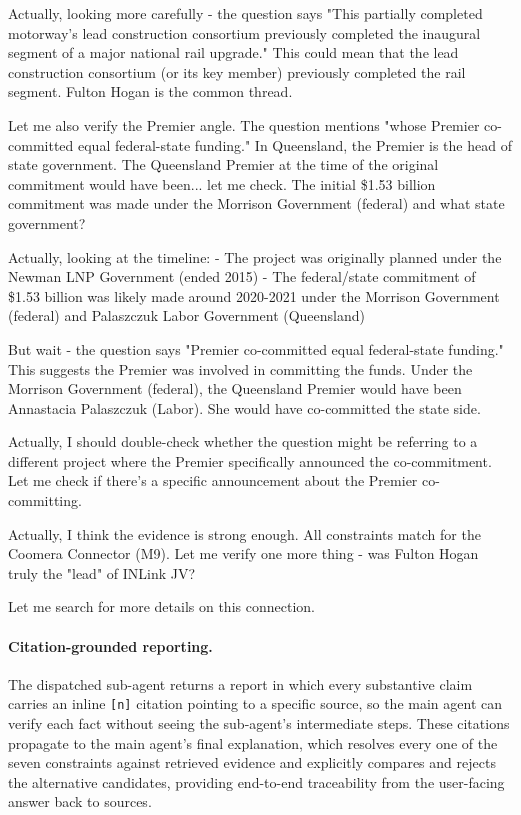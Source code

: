 \documentclass{llmxive}
\begin{document}
\begin{tcolorbox}
Actually, looking more carefully - the question says "This partially completed motorway's lead construction consortium previously completed the inaugural segment of a major national rail upgrade." This could mean that the lead construction consortium (or its key member) previously completed the rail segment. Fulton Hogan is the common thread.

Let me also verify the Premier angle. The question mentions "whose Premier co-committed equal federal-state funding." In Queensland, the Premier is the head of state government. The Queensland Premier at the time of the original commitment would have been... let me check. The initial \$1.53 billion commitment was made under the Morrison Government (federal) and what state government? 

Actually, looking at the timeline:
- The project was originally planned under the Newman LNP Government (ended 2015)
- The federal/state commitment of \$1.53 billion was likely made around 2020-2021 under the Morrison Government (federal) and Palaszczuk Labor Government (Queensland)

But wait - the question says "Premier co-committed equal federal-state funding." This suggests the Premier was involved in committing the funds. Under the Morrison Government (federal), the Queensland Premier would have been Annastacia Palaszczuk (Labor). She would have co-committed the state side.

Actually, I should double-check whether the question might be referring to a different project where the Premier specifically announced the co-commitment. Let me check if there's a specific announcement about the Premier co-committing.

Actually, I think the evidence is strong enough. All constraints match for the Coomera Connector (M9). Let me verify one more thing - was Fulton Hogan truly the "lead" of INLink JV?

Let me search for more details on this connection.
\end{tcolorbox}

\paragraph{Citation-grounded reporting.} The dispatched sub-agent returns a report in which every substantive claim carries an inline \texttt{[n]} citation pointing to a specific source, so the main agent can verify each fact without seeing the sub-agent's intermediate steps. These citations propagate to the main agent's final explanation, which resolves every one of the seven constraints against retrieved evidence and explicitly compares and rejects the alternative candidates, providing end-to-end traceability from the user-facing answer back to sources.
\end{document}
